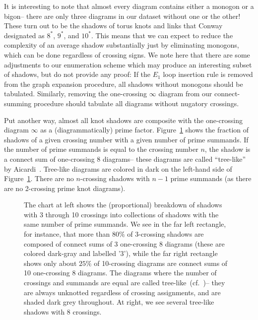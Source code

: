 \documentclass[amsmath,secnumarabic,floatfix,amssymb,nofootinbib,nobibnotes,letterpaper,11pt,tightenlines,showkeys]{revtex4}
\theoremstyle{definition}
\newcommand{\loopinsert}{E_1}
\let\mgp=\marginpar \marginparwidth18mm \marginparsep1mm
\def\marginpar#1{\mgp{\raggedright\tiny #1}}
\let\lbl=\label
\def\label#1{\lbl{#1}\ifinner\else\marginpar{\ref{#1} #1}\ignorespaces\fi}
\begin{document}
It is interesting to note that almost every diagram contains either a monogon or a bigon-- there are only three diagrams in our dataset without one or the other! These turn out to be the shadows of torus knots and links that Conway designated as $8^*$, $9^*$, and $10^*$. This means that we can expect to reduce the complexity of an average shadow substantially just by eliminating monogons, which can be done regardless of crossing signs. We note here that there are some adjustments to our enumeration scheme which may produce an interesting subset of shadows, but do not provide any proof: If the $\loopinsert$ loop insertion rule is removed from the graph expansion procedure, all shadows without monogons should be tabulated. Similarly, removing the one-crossing $\infty$ diagram from our connect-summing procedure should tabulate all diagrams without nugatory crossings.

Put another way, almost all knot shadows are composite with the one-crossing diagram $\infty$ as a (diagrammatically) prime factor. Figure~\ref{fig:proportiongraphic} shows the fraction of shadows of a given crossing number with a given number of prime summands. If the number of prime summands is equal to the crossing number $n$, the shadow is a connect sum of one-crossing $8$ diagrams-- these diagrams are called ``tree-like'' by Aicardi~\cite{Aicardi:1994uq}.
Tree-like diagrams are colored in dark on the left-hand side of Figure~\ref{fig:proportiongraphic}. There are no $n$-crossing shadows with $n-1$ prime summands (as there are no 2-crossing prime knot diagrams).

\begin{figure}
\hfill
{}
\hfill
{}
\hfill
\hphantom{.}
\caption{The chart at left shows the (proportional) breakdown of shadows with 3 through 10 crossings into collections of shadows with the same number of prime summands. We see in the far left rectangle, for instance, that more than $80\%$ of 3-crossing shadows are composed of connect sums of 3 one-crossing $8$ diagrams (these are colored dark-gray and labelled '3'), while the far right rectangle shows only about $25\%$ of 10-crossing diagrams are connect sums of 10 one-crossing $8$ diagrams. The diagrams where the number of crossings and summands are equal are called tree-like~(cf.~\cite{Aicardi:1994uq})-- they are always unknotted regardless of crossing assignments, and are shaded dark grey throughout. At right, we see several tree-like shadows with 8 crossings.}
\label{fig:proportiongraphic}
\end{figure}
\end{document}
